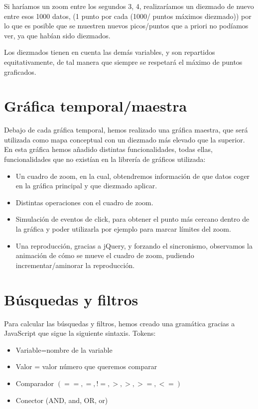 Si haríamos un zoom entre los segundos 3, 4, realizaríamos un diezmado de nuevo entre esos 1000 datos, (1 punto por cada (1000/ {puntos máximos diezmado})) por lo que es posible que se muestren nuevos picos/puntos que a priori no podíamos ver, ya que habían sido diezmados.

Los diezmados tienen en cuenta las demás variables, y son repartidos equitativamente, de tal manera que siempre se respetará el máximo de puntos graficados.


\section{Gráfica temporal/maestra}

Debajo de cada gráfica temporal, hemos realizado una gráfica maestra, que será utilizada como mapa conceptual con un diezmado más elevado que la superior. En esta gráfica hemos añadido distintas funcionalidades, todas ellas, funcionalidades que no existían en la librería de gráficos utilizada:
\begin{itemize}
	\item Un cuadro de zoom, en la cual, obtendremos información de que datos coger en la gráfica principal y que diezmado aplicar.

	\item Distintas operaciones con el cuadro de zoom.

	\item Simulación de eventos de click, para obtener el punto más cercano dentro de la gráfica y poder utilizarla por ejemplo para marcar límites del zoom.

	\item Una reproducción, gracias a jQuery, y forzando el sincronismo, observamos la animación de cómo se mueve el cuadro de zoom, pudiendo incrementar/aminorar la reproducción.

\end{itemize}



\section{Búsquedas y filtros}

Para calcular las búsquedas y filtros, hemos creado una gramática gracias a JavaScript que sigue la siguiente sintaxis.
Tokens:
\begin{itemize}
	\item Variable=nombre de la variable
	\item Valor = valor número que queremos comparar
	\item Comparador $(==,=,!=,>,>,>=,<=)$
	\item Conector (AND, and, OR, or)
\end{itemize}



